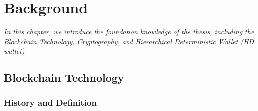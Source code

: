 \setlength{\abovedisplayskip}{0pt}
\setlength{\belowdisplayskip}{0pt}
\setlength{\abovedisplayshortskip}{0pt}
\setlength{\belowdisplayshortskip}{0pt}

\chapter{Background}
\label{chap:background}
\textit{In this chapter, we introduce the foundation knowledge of the thesis, including the Blockchain Technology, Cryptography, and Hierarchical Deterministic Wallet (HD wallet)}

\minitoc

\section{Blockchain Technology}

\subsection{History and Definition}


